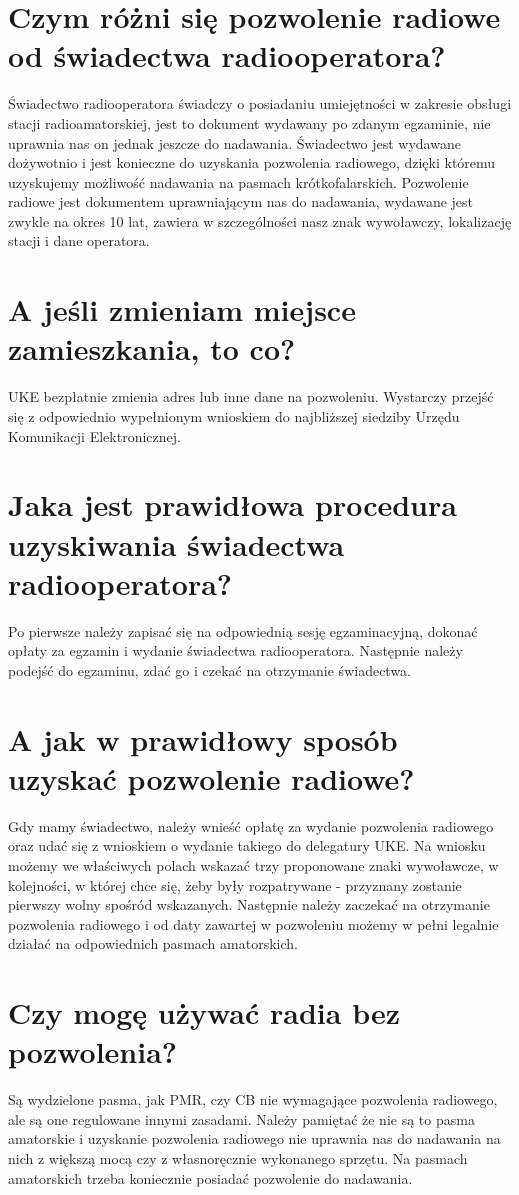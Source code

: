 \documentclass[a4paper,12pt]{article}
\begin{document}
\section{Czym różni się pozwolenie radiowe od świadectwa radiooperatora?}
Świadectwo radiooperatora świadczy o posiadaniu umiejętności w zakresie obsługi stacji radioamatorskiej, jest to dokument wydawany po zdanym egzaminie, nie uprawnia nas on jednak jeszcze do nadawania. Świadectwo jest wydawane dożywotnio i jest konieczne do uzyskania pozwolenia radiowego, dzięki któremu uzyskujemy możliwość nadawania na pasmach krótkofalarskich. Pozwolenie radiowe jest dokumentem uprawniającym nas do nadawania, wydawane jest zwykle na okres 10 lat, zawiera w szczególności nasz znak wywoławczy, lokalizację stacji i dane operatora.

\section{A jeśli zmieniam miejsce zamieszkania, to co?}
UKE bezpłatnie zmienia adres lub inne dane na pozwoleniu. Wystarczy przejść się z odpowiednio wypełnionym wnioskiem do najbliższej siedziby Urzędu Komunikacji Elektronicznej.

\section{Jaka jest prawidłowa procedura uzyskiwania świadectwa radiooperatora?}
Po pierwsze należy zapisać się na odpowiednią sesję egzaminacyjną, dokonać opłaty za egzamin i wydanie świadectwa radiooperatora. Następnie należy podejść do egzaminu, zdać go i czekać na otrzymanie świadectwa.

\section{A jak w prawidłowy sposób uzyskać pozwolenie radiowe?}
Gdy mamy świadectwo, należy wnieść opłatę za wydanie pozwolenia radiowego oraz udać się z wnioskiem o wydanie takiego do delegatury UKE. Na wniosku możemy we właściwych polach wskazać trzy proponowane znaki wywoławcze, w kolejności, w której chce się, żeby były rozpatrywane - przyznany zostanie pierwszy wolny spośród wskazanych. Następnie należy zaczekać na otrzymanie pozwolenia radiowego i od daty zawartej w pozwoleniu możemy w pełni legalnie działać na odpowiednich pasmach amatorskich.

\section{Czy mogę używać radia bez pozwolenia?}
Są wydzielone pasma, jak PMR, czy CB nie wymagające pozwolenia radiowego, ale są one regulowane innymi zasadami. Należy pamiętać że nie są to pasma amatorskie i uzyskanie pozwolenia radiowego nie uprawnia nas do nadawania na nich z większą mocą czy z własnoręcznie wykonanego sprzętu. Na pasmach amatorskich trzeba koniecznie posiadać pozwolenie do nadawania.
\end{document}
